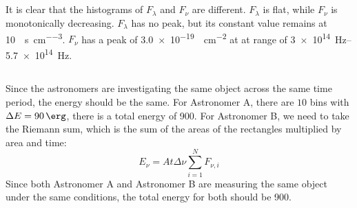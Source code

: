 \documentclass{article}
\begin{document}
\subsection{}

It is clear that the histograms of \(F_\lambda\) and \(F_\nu\) are different.
\(F_\lambda\) is flat, while \(F_\nu\) is monotonically decreasing.
\(F_\lambda\) has no peak, but its constant value remains at \SI{10}{\erg\per\second\per\centi\meter\cubed}.
\(F_\nu\) has a peak of \SI{3.0e-19}{\erg\per\centi\meter\squared} at at range of \SI{3e+14}{\hertz}--\SI{5.7e+14}{\hertz}.

\subsection{}

Since the astronomers are investigating the same object across the same time period, the energy should be the same.
For Astronomer A, there are \(10\) bins with \(\Delta E = \SI{90}{\erg}\), there is a total energy of \SI{900}{\erg}.
For Astronomer B, we need to take the Riemann sum, which is the sum of the areas of the rectangles multiplied by area and time:
\begin{equation}
    E_\nu = A t \Delta \nu \sum_{i = 1}^N F_{\nu, i}
\end{equation}
Since both Astronomer A and Astronomer B are measuring the same object under the same conditions, the total energy for both should be \SI{900}{\erg}.

\subsection{}
\end{document}
